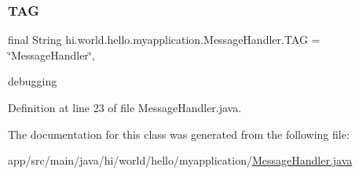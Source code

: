 \mbox{\label{classhi_1_1world_1_1hello_1_1myapplication_1_1_message_handler_a0ab36705ac35817da5d6d7d21779a318}} 
\subsubsection{\texorpdfstring{TAG}{TAG}}
{\footnotesize\ttfamily final String hi.\+world.\+hello.\+myapplication.\+Message\+Handler.\+T\+AG = \char`\"{}Message\+Handler\char`\"{}\hspace{0.3cm}{\ttfamily [static]}, {\ttfamily [private]}}



debugging 



Definition at line 23 of file Message\+Handler.\+java.



The documentation for this class was generated from the following file\+:\begin{DoxyCompactItemize}
\item 
app/src/main/java/hi/world/hello/myapplication/\mbox{\hyperlink{_message_handler_8java}{Message\+Handler.\+java}}\end{DoxyCompactItemize}
